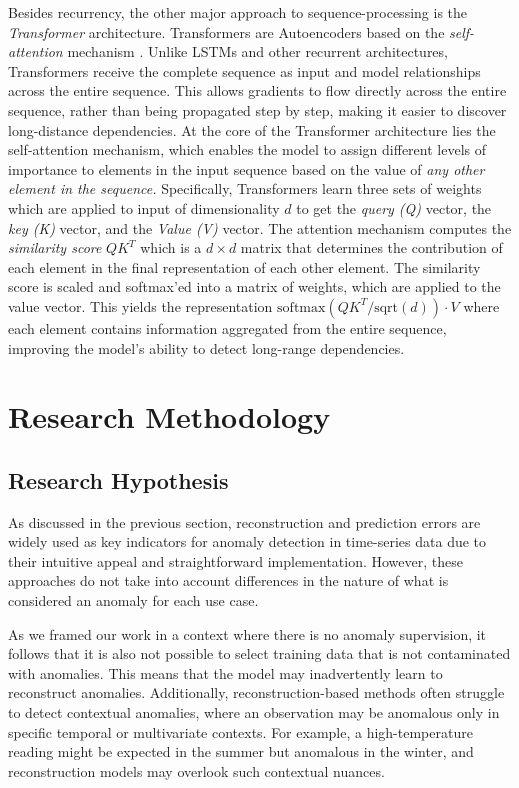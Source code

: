 \documentclass[runningheads]{llncs}
\begin{document}
Besides recurrency, the other major approach to sequence-processing is
the \emph{Transformer} architecture. Transformers are Autoencoders
based on the \emph{self-attention} mechanism \cite{vaswani-etal:2017}.
Unlike LSTMs and other recurrent architectures, Transformers receive
the complete sequence as input and model relationships across the
entire sequence. This allows gradients to flow directly across the
entire sequence, rather than being propagated step by step, making it
easier to discover long-distance dependencies.
%
At the core of the Transformer architecture lies the self-attention
mechanism, which enables the model to assign different levels of
importance to elements in the input sequence
based on the value of \emph{any other element in the sequence.}
Specifically, Transformers learn three sets of weights which are
applied to input of dimensionality $d$ to get the
\emph{query (Q)} vector, the \emph{key (K)} vector,
and the \emph{Value (V)} vector.
The attention mechanism computes the \emph{similarity score} $QK^T$
which is a $d \times d$ matrix that determines the contribution of each
element in the final representation of each other element. The
similarity score is scaled and softmax'ed into a matrix of weights,
which are applied to the value vector. This yields the representation
%
$\mathrm{softmax}\left(QK^T / \mathrm{sqrt}(d)\right)\cdot V$
%
where each element contains information aggregated from the entire
sequence, improving the model's ability to detect long-range dependencies.



\section{Research Methodology}
\label{sec:method}

\subsection{Research Hypothesis}
\label{sec:method:hypothesis}

As discussed in the previous section, reconstruction and prediction
errors are widely used as key indicators for anomaly detection in
time-series data due to their intuitive appeal and straightforward
implementation. However, these approaches do not take into account
differences in the nature of what is considered an anomaly for each
use case.

As we framed our work in a context where there is no anomaly
supervision, it follows that it is also not possible to select
training data that is not contaminated with anomalies. This means that
the model may inadvertently learn to reconstruct anomalies.
Additionally, reconstruction-based methods often struggle to detect
contextual anomalies, where an observation may be anomalous only in
specific temporal or multivariate contexts. For example, a
high-temperature reading might be expected in the summer but anomalous
in the winter, and reconstruction models may overlook such contextual
nuances.
\end{document}
